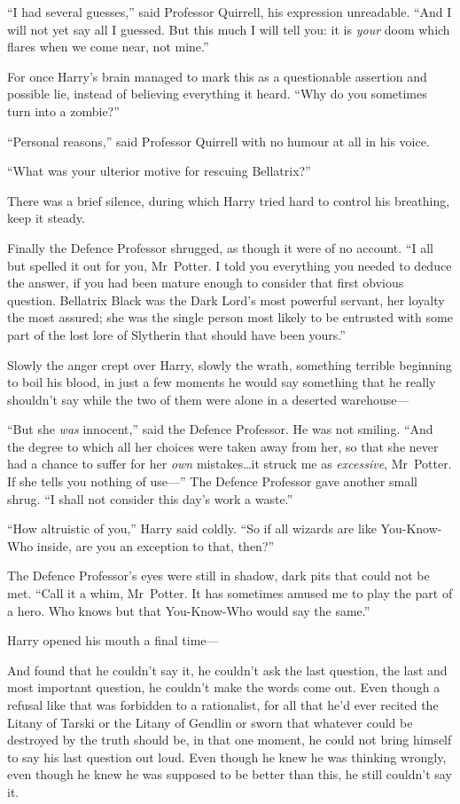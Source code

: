 “I had several guesses,” said Professor Quirrell, his expression unreadable.
“And I will not yet say all I guessed. But this much I will tell you: it is \emph{your} doom which flares when we come near, not mine.”

For once Harry’s brain managed to mark this as a questionable assertion and possible lie, instead of believing everything it heard.
“Why do you sometimes turn into a zombie?”

“Personal reasons,” said Professor Quirrell with no humour at all in his voice.

“What was your ulterior motive for rescuing Bellatrix?”

There was a brief silence, during which Harry tried hard to control his breathing, keep it steady.

Finally the Defence Professor shrugged, as though it were of no account.
“I all but spelled it out for you, Mr~Potter. I told you everything you needed to deduce the answer, if you had been mature enough to consider that first obvious question. Bellatrix Black was the Dark Lord’s most powerful servant, her loyalty the most assured; she was the single person most likely to be entrusted with some part of the lost lore of Slytherin that should have been yours.”

Slowly the anger crept over Harry, slowly the wrath, something terrible beginning to boil his blood, in just a few moments he would say something that he really shouldn’t say while the two of them were alone in a deserted warehouse—

“But she \emph{was} innocent,” said the Defence Professor. He was not smiling.
“And the degree to which all her choices were taken away from her, so that she never had a chance to suffer for her \emph{own} mistakes…it struck me as \emph{excessive}, Mr~Potter. If she tells you nothing of use—” The Defence Professor gave another small shrug.
“I shall not consider this day’s work a waste.”

“How altruistic of you,” Harry said coldly.
“So if all wizards are like You-Know-Who inside, are you an exception to that, then?”

The Defence Professor’s eyes were still in shadow, dark pits that could not be met.
“Call it a whim, Mr~Potter. It has sometimes amused me to play the part of a hero. Who knows but that You-Know-Who would say the same.”

Harry opened his mouth a final time—

And found that he couldn’t say it, he couldn’t ask the last question, the last and most important question, he couldn’t make the words come out. Even though a refusal like that was forbidden to a rationalist, for all that he’d ever recited the Litany of Tarski or the Litany of Gendlin or sworn that whatever could be destroyed by the truth should be, in that one moment, he could not bring himself to say his last question out loud. Even though he knew he was thinking wrongly, even though he knew he was supposed to be better than this, he still couldn’t say it.

